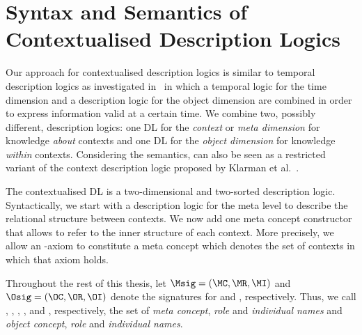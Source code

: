 
\section{Syntax and Semantics of Contextualised Description Logics}
\label{sec:syn-seman-cdl}

Our approach for contextualised description logics is similar to temporal description logics as
investigated in~\cite{LuWZ-TIME08} in which a temporal logic for the time dimension and a
description logic for the object dimension are combined in order to express information valid at a
certain time. We combine two, possibly different, description logics: one DL \LM for the
\emph{context} or \emph{meta dimension} for knowledge \emph{about} contexts and one DL \LO for the
\emph{object dimension} for knowledge \emph{within} contexts.
%
Considering the semantics, \LMLO can also be seen as a restricted variant of the context description
logic proposed by Klarman et al.~\cite{KG16}.

The contextualised DL \LMLO is a two-dimensional and two-sorted description logic. Syntactically, we
start with a description logic \LM for the meta level to describe the relational structure between
contexts. We now add one meta concept constructor that allows to refer to the inner structure of
each context. More precisely, we allow an \LO-axiom to constitute a meta concept which denotes the
set of contexts in which that axiom holds.

Throughout the rest of this thesis, let $\Msig = (\MC, \MR, \MI)$ and $\Osig = (\OC, \OR, \OI)$
denote the signatures for \LM and \LO, respectively. Thus, we call \MC, \MR, \MI, \OC, \OR and \OI,
respectively, the set of \emph{meta concept}, \emph{role} and \emph{individual names} and
\emph{object concept}, \emph{role} and \emph{individual names}.

